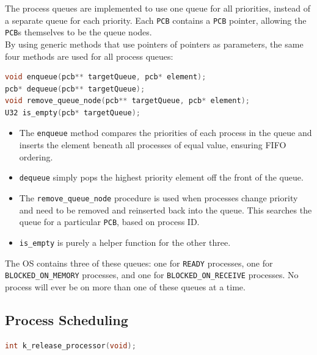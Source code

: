 \documentclass[12pt]{report}
\begin{document}
The process queues are implemented to use one queue for all priorities, instead of a separate queue for each priority. Each {\tt PCB} contains a {\tt PCB} pointer, allowing the {\tt PCB}s themselves to be the queue nodes. \\
By using generic methods that use pointers of pointers as parameters, the same four methods are used for all process queues: \\
\begin{minipage}{\textwidth}
\begin{lstlisting}[language=C, frame=single]
void enqueue(pcb** targetQueue, pcb* element);
pcb* dequeue(pcb** targetQueue);
void remove_queue_node(pcb** targetQueue, pcb* element);
U32 is_empty(pcb* targetQueue);
\end{lstlisting}
\end{minipage}

\begin{itemize}
\item The {\tt enqueue} method compares the priorities of each process in the queue and inserts the element beneath all processes of equal value, ensuring FIFO ordering.
\item {\tt dequeue} simply pops the highest priority element off the front of the queue.
\item The {\tt remove\_queue\_node} procedure is used when processes change priority and need to be removed and reinserted back into the queue. This searches the queue for a particular {\tt PCB}, based on process ID.
\item {\tt is\_empty} is purely a helper function for the other three.
\end{itemize}

The OS contains three of these queues: one for {\tt READY} processes, one for {\tt BLOCKED\_ON\_MEMORY} processes, and one for {\tt BLOCKED\_ON\_RECEIVE} processes. No process will ever be on more than one of these queues at a time.\\

\subsection{Process Scheduling}

\begin{minipage}{\textwidth}
\begin{lstlisting}[language=C, frame=single]
int k_release_processor(void);
\end{lstlisting}
\end{minipage}
\end{document}
